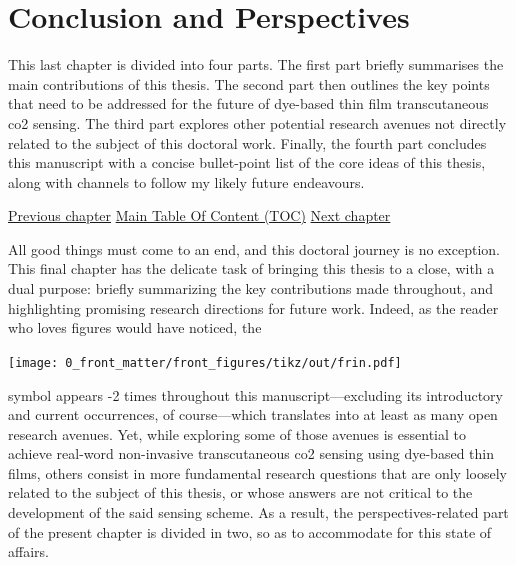 \chapter{Conclusion and Perspectives}\label{chap:conclusion}

\begin{tldrbox}
	
	This last chapter is divided into four parts. The first part briefly summarises the main contributions of this thesis. The second part then outlines the key points that need to be addressed for the future of dye-based thin film transcutaneous \gls{co2} sensing. The third part explores other potential research avenues not directly related to the subject of this doctoral work. Finally, the fourth part concludes this manuscript with a concise bullet-point list of the core ideas of this thesis, along with channels to follow my likely future endeavours.
	
	\tcblower
	
	\hyperref[chap:thin_film]{Previous chapter} \hfill \hyperref[chapter:toc]{Main Table Of Content (TOC)} \hfill \hyperref[chap:biblio]{Next chapter}

\end{tldrbox}

All good things must come to an end, and this doctoral journey is no exception. This final chapter has the delicate task of bringing this thesis to a close, with a dual purpose: briefly summarizing the key contributions made throughout, and highlighting promising research directions for future work. Indeed, as the reader who loves figures would have noticed, the
\begin{center} \texttt{[image: 0\_front\_matter/front\_figures/tikz/out/frin.pdf]}
\end{center}
\noindent{}symbol appears \the\numexpr\value{mfrincounter}-2\relax{} times throughout this manuscript---excluding its introductory and current occurrences, of course---which translates into at least as many open research avenues. Yet, while exploring some of those avenues is essential to achieve real-word non-invasive transcutaneous \gls{co2} sensing using dye-based thin films, others consist in more fundamental research questions that are only loosely related to the subject of this thesis, or whose answers are not critical to the development of the said sensing scheme. As a result, the perspectives-related part of the present chapter is divided in two, so as to accommodate for this state of affairs.

